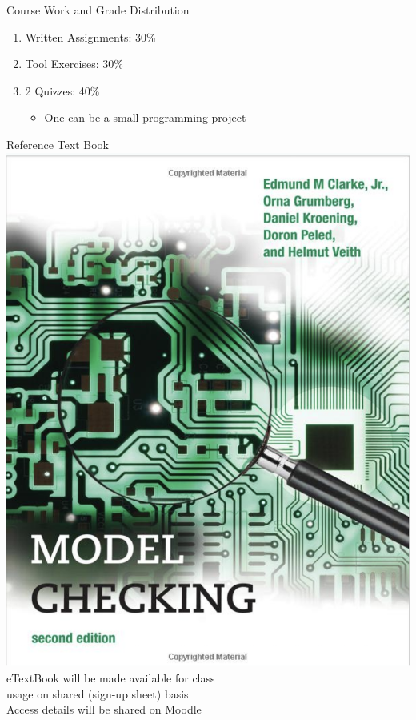 \documentclass{beamer}
\begin{document}
\begin{frame}{Course Work and Grade Distribution}
\begin{enumerate}
\item  Written Assignments: 30\%

\item  Tool Exercises: 30\%

\item  2 Quizzes: 40\%
\begin{itemize}
\item One can be a small programming project
\end{itemize}
\end{enumerate}
\end{frame}

\begin{frame}{Reference Text Book}
\includegraphics[scale=0.25]{pics/bookcover.png} \\
eTextBook will be made available for class \\
usage on shared (sign-up sheet) basis \\
Access details will be shared on Moodle
\end{frame}
\end{document}
